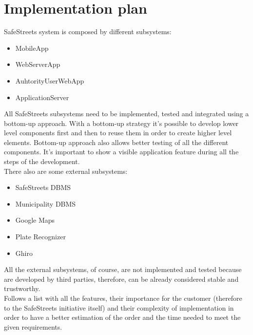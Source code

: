     \section{Implementation plan}
    SafeStreets system is composed by different subsystems:
    \begin{itemize}
        \item MobileApp
        \item WebServerApp
        \item AuhtorityUserWebApp
        \item ApplicationServer 
    \end{itemize}   
    All SafeStreets subsystems need to be implemented, tested and integrated
    using a bottom-up approach. With a bottom-up strategy it's possible to
    develop lower level components first and then to reuse them in order to
    create higher level elements. Bottom-up approach also allows better testing
    of all the different components. It's important to show a visible
    application feature during all the steps of the development.\\
    There also are some external subsystems: 
    \begin{itemize}
        \item SafeStreets DBMS
        \item Municipality DBMS
        \item Google Maps
        \item Plate Recognizer
        \item Ghiro
    \end{itemize}   
    All the external subsystems, of course, are not implemented and tested
    because are developed by third parties, therefore, can be already considered
    stable and trustworthy.\\
    Follows a list with all the features, their importance for the customer
    (therefore to the SafeStreets initiative itself) and their complexity of
    implementation in order to have a better estimation of the order and the
    time needed to meet the given requirements.
